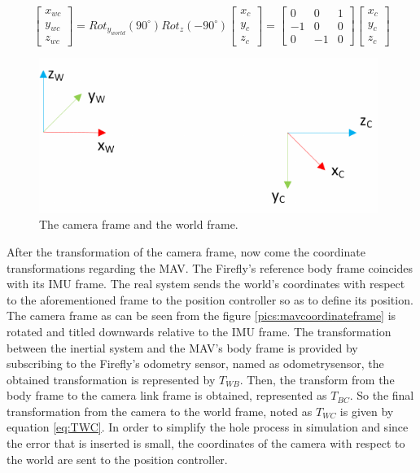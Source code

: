  \begin{equation}
 \label{eq:camtoworldrot}
 \left[\begin{array}{c}
 x_{wc} \\ y_{wc} \\ z_{wc}  \end{array} \right] = Rot_{y_{world}}(90^{\circ})Rot_z(-90^{\circ})\left[ \begin{array}{c} x_c \\ y_c \\z_c \end{array} \right] = \begin{bmatrix} 0 & 0 & 1 \\ -1 & 0 & 0 \\ 0 & -1 & 0 \end{bmatrix} \left[ \begin{array}{c} x_c \\ y_c \\z_c \end{array} \right]
 \end{equation}
  
  
 \begin{figure}
    \centering
    \includegraphics[width=0.98\textwidth]{images/world_camera_frame.pdf}
    \caption{The camera frame and the world frame.}
    \label{pics:worldcamframe}
 \end{figure}
 
 After the transformation of the camera frame, now come the coordinate transformations regarding the MAV. The Firefly's reference body frame coincides with its IMU frame. The real system sends the world's coordinates with respect to the aforementioned frame to the position controller so as to define its position. The camera frame as can be seen from the figure \ref{pics:mavcoordinateframe} is rotated and titled downwards relative to the IMU frame. The transformation between the inertial system and the MAV's body frame is provided by subscribing to the Firefly's odometry sensor, named as odometry\textunderscore sensor, the obtained transformation is represented by $T_{WB}$. Then, the transform from the body frame to the camera link frame is obtained, represented as $T_{BC}$. So the final transformation from the camera to the world frame, noted as $T_{WC}$ is given by equation \ref{eq:TWC}. In order to simplify the hole process in simulation and since the error that is inserted is small, the coordinates of the camera with respect to the world are sent to the position controller.  
 
